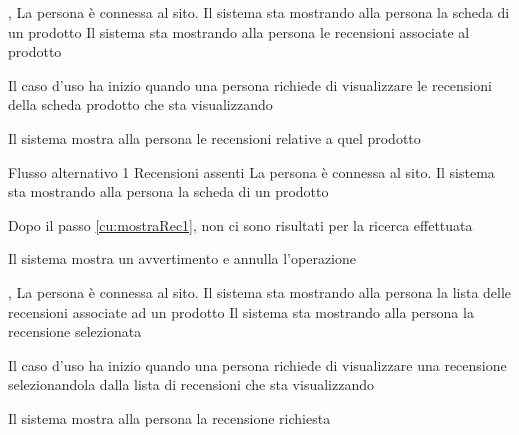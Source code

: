 
{, }
{La persona è connessa al sito. Il sistema sta mostrando alla persona la scheda di un prodotto}
{Il sistema sta mostrando alla persona le recensioni associate al prodotto}
{\begin{enumCU}
	\item Il caso d'uso ha inizio quando una persona richiede di visualizzare le recensioni della scheda prodotto che sta visualizzando\label{cu:mostraRec1}
	\item Il sistema mostra alla persona le recensioni relative a quel prodotto
\end{enumCU}
}
%
{Flusso alternativo 1}%
{Recensioni assenti}%
{La persona è connessa al sito. Il sistema sta mostrando alla persona la scheda di un prodotto}%
{\postNulle}%
{\begin{enumCU}
		\item Dopo il passo \ref{cu:mostraRec1}, non ci sono risultati per la ricerca effettuata
		\item Il sistema mostra un avvertimento e annulla l'operazione
\end{enumCU}}


{, }
{La persona è connessa al sito. Il sistema sta mostrando alla persona la lista delle recensioni associate ad un prodotto}
{Il sistema sta mostrando alla persona la recensione selezionata}
{\begin{enumCU}
	\item Il caso d'uso ha inizio quando una persona richiede di visualizzare una recensione selezionandola dalla lista di recensioni che sta visualizzando\label{cu:mostraRec2}
	\item Il sistema mostra alla persona la recensione richiesta
\end{enumCU}
}


